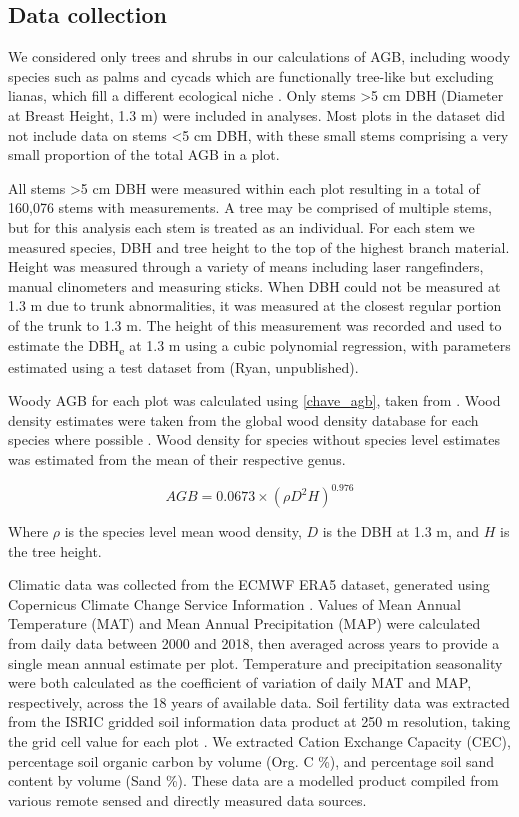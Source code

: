 \documentclass[11pt,a4paper]{article}
\begin{document}
\subsection{Data collection}
 
We considered only trees and shrubs in our calculations of AGB, including woody species such as palms and cycads which are functionally tree-like but excluding lianas, which fill a different ecological niche \citep{Selaya2008}. Only stems >5 cm DBH (Diameter at Breast Height, 1.3 m) were included in analyses. Most plots in the dataset did not include data on stems <5 cm DBH, with these small stems comprising a very small proportion of the total AGB in a plot. 


All stems >5 cm DBH were measured within each plot resulting in a total of 160,076 stems with measurements. A tree may be comprised of multiple stems, but for this analysis each stem is treated as an individual. For each stem we measured species, DBH and tree height to the top of the highest branch material. Height was measured through a variety of means including laser rangefinders, manual clinometers and measuring sticks. When DBH could not be measured at 1.3 m due to trunk abnormalities, it was measured at the closest regular portion of the trunk to 1.3 m. The height of this measurement was recorded and used to estimate the DBH\textsubscript{e} at 1.3 m using a cubic polynomial regression, with parameters estimated using a test dataset from (Ryan, unpublished).

Woody AGB for each plot was calculated using \autoref{chave_agb}, taken from \citet{Chave2014}. Wood density estimates were taken from the global wood density database for each species where possible \citep{Chave2009, Zanne2009}. Wood density for species without species level estimates was estimated from the mean of their respective genus. 

\begin{equation}
	AGB = 0.0673 \times (\rho D^{2} H)^{0.976}
	\label{chave_agb}
\end{equation}

Where $\rho$ is the species level mean wood density, $D$ is the DBH at 1.3 m, and $H$ is the tree height.

Climatic data was collected from the ECMWF ERA5 dataset, generated using Copernicus Climate Change Service Information \citep{ERA5}. Values of Mean Annual Temperature (MAT) and Mean Annual Precipitation (MAP) were calculated from daily data between 2000 and 2018, then averaged across years to provide a single mean annual estimate per plot. Temperature and precipitation seasonality were both calculated as the coefficient of variation of daily MAT and MAP, respectively, across the 18 years of available data. Soil fertility data was extracted from the ISRIC gridded soil information data product at 250 m resolution, taking the grid cell value for each plot \citep{Hengl2017}. We extracted Cation Exchange Capacity (CEC), percentage soil organic carbon by volume (Org. C \%), and percentage soil sand content by volume (Sand \%). These data are a modelled product compiled from various remote sensed and directly measured data sources. 
\end{document}
